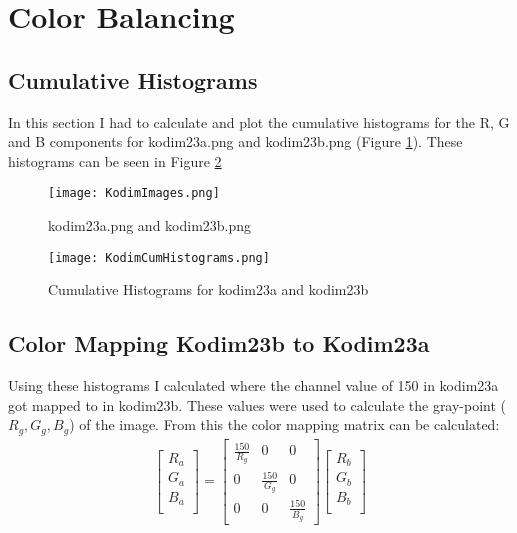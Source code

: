 \section{Color Balancing}
\subsection{Cumulative Histograms}
In this section I had to calculate and plot the cumulative histograms for the R, G and B components for kodim23a.png and kodim23b.png (Figure \ref{fig:KodimImages}). These histograms can be seen in Figure \ref{fig:KodimCumHistogram}

\begin{figure}[h]
    \texttt{[image: KodimImages.png]}
    \centering
    \caption{kodim23a.png and kodim23b.png}
    \label{fig:KodimImages}
\end{figure}

\begin{figure}[h]
    \texttt{[image: KodimCumHistograms.png]}
    \centering
    \caption{Cumulative Histograms for kodim23a and kodim23b}
    \label{fig:KodimCumHistogram}
\end{figure}

\subsection{Color Mapping Kodim23b to Kodim23a}
Using these histograms I calculated where the channel value of 150 in kodim23a got mapped to in kodim23b. These values were used to calculate the gray-point ($R_g, G_g, B_g$) of the image. From this the color mapping matrix can be calculated:
\begin{gather}
    \begin{bmatrix}
        R_a \\
        G_a \\
        B_a \\       
    \end{bmatrix}
    =
    \begin{bmatrix}
        \frac{150}{R_g} & 0 & 0 \\
        0 & \frac{150}{G_g} & 0 \\
        0 & 0 & \frac{150}{B_g}
    \end{bmatrix}
    \begin{bmatrix}
        R_b \\
        G_b \\
        B_b \\
    \end{bmatrix}
\end{gather}

